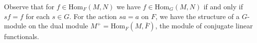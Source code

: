 Observe that for $f \in \text{Hom}_F(M, N)$ we have $f \in \text{Hom}_G(M, N)$ if and only if $sf = f$ for each $s \in G$. For the action $sa = a$ on $F$, we have the structure of a $G$-module on the dual module $M^+ = \text{Hom}_F(M, \bar{F})$, the module of conjugate linear functionals.
